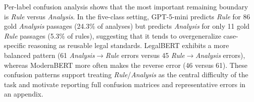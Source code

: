 Per-label confusion analysis shows that the most important remaining boundary is \textit{Rule} versus \textit{Analysis}. In the five-class setting, GPT-5-mini predicts \textit{Rule} for 86 gold \textit{Analysis} passages (24.3\% of analyses) but predicts \textit{Analysis} for only 11 gold \textit{Rule} passages (5.3\% of rules), suggesting that it tends to overgeneralize case-specific reasoning as reusable legal standards. LegalBERT exhibits a more balanced pattern (61 \textit{Analysis}$\rightarrow$\textit{Rule} errors versus 45 \textit{Rule}$\rightarrow$\textit{Analysis} errors), whereas ModernBERT more often makes the reverse error (46 versus 61). These confusion patterns support treating \textit{Rule}/\textit{Analysis} as the central difficulty of the task and motivate reporting full confusion matrices and representative errors in an appendix.
